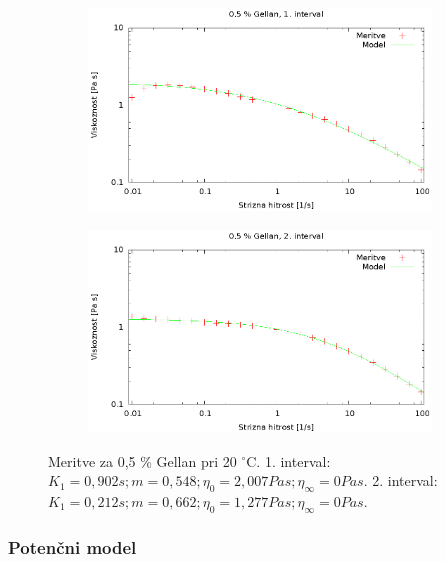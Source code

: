 \documentclass{article}
\begin{document}
\begin{figure}
	\centering
	\begin{subfigure}[b]{0.4\textwidth}
	       \includegraphics[width=\textwidth]{cross_gel3.eps}
	   \end{subfigure}
	   \begin{subfigure}[b]{0.4\textwidth}
	       \includegraphics[width=\textwidth]{cross_gel4.eps}
	   \end{subfigure}
	\caption{Meritve za 0,5 \% Gellan pri 20 $^\circ$C. 1. interval: $K_1 = 0,902 s; m = 0,548; \eta_0 = 2,007 Pa s; \eta_\infty = 0 Pa s$. 2. interval: $K_1 = 0,212 s; m = 0,662; \eta_0 = 1,277 Pa s; \eta_\infty = 0 Pa s$.}
	\label{fig:cross_gel2}
\end{figure}

\subsubsection{Potenčni model}
\end{document}
